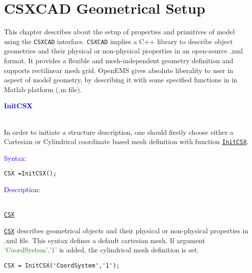 \chapter{CSXCAD Geometrical Setup}\label{chap-CSXCAD}
	This chapter describes about the setup of properties and primitives of model using the \texttt{CSXCAD} interface. \texttt{CSXCAD} implies a C++ library to describe object geometries and their physical or non-physical properties in an open-source .xml format.  It provides a flexible and mesh-independent geometry definition and supports rectilinear mesh grid. OpenEMS gives absolute liberality to user in aspect of model geometry, by describing it with some specified functions in in Matlab platform (.m file). 
 
\textcolor{blue}{\begin{large}\textbf{InitCSX}\end{large}}\\
In order to initiate a structure description, one should firstly choose either a Cartesian or Cylindrical coordinate based mesh definition with function \hyperref[para:InitCSX]{\texttt{InitCSX}}.

\textcolor{blue}{\begin{large}Syntax:\end{large}}
 \begin{lstlisting}
CSX =InitCSX();
 \end{lstlisting}
 
\textcolor{blue}{\begin{large}Description:\end{large}}\\
\hyperref[para:CSX]{\texttt{CSX}}
  \begin{myindentpar}\hyperref[para:CSX]{\texttt{CSX}} describes geometrical objects and their physical or non-physical properties in .xml file. This syntax defines a default cartesian mesh. If argument \textcolor{green} {'CoordSystem','1'} is added, the cylindrical mesh definition is set. 
   \end{myindentpar} 
   
   
\begin{lstlisting}
CSX = InitCSX('CoordSystem','1');
\end{lstlisting}
 
   

 

 \label{CSXprimitives} 

